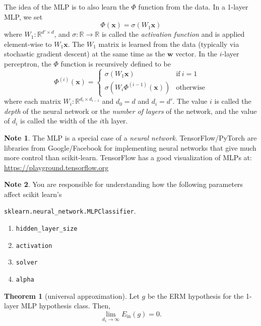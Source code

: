 \documentclass[10pt]{exam}
\theoremstyle{definition}
\newtheorem{note}{Note}
\newtheorem{theorem}{Theorem}
\newcommand{\R}{\mathbb R}
\newcommand{\Ein}{E_{\text{in}}}
\newcommand{\w}{\mathbf w}
\newcommand{\x}{\mathbf x}
\begin{document}
The idea of the MLP is to also learn the $\Phi$ function from the data.
In a 1-layer MLP, we set
\begin{equation}
    \Phi(\x) = \sigma ( W_1 \x)
\end{equation}
where $W_1 : \R^{d'\times d}$,
and $\sigma : \R \to \R$ is called the \emph{activation function} and is applied element-wise to $W_1\x$.
The $W_1$ matrix is learned from the data (typically via stochastic gradient descent) at the same time as the $\w$ vector.
In the $i$-layer perceptron, the $\Phi$ function is recursively defined to be
\begin{equation}
    \Phi^{(i)}(\x) =
    \begin{cases}
        \sigma (W_1 \x) & \text{if}~i = 1 \\
        \sigma (W_i \Phi^{(i-1)}(\x)) & \text{otherwise}
    \end{cases}
\end{equation}
where each matrix $W_i : \R^{d_i \times d_{i-1}}$ and $d_0 = d$ and $d_i = d'$.
The value $i$ is called the \emph{depth} of the neural network or the \emph{number of layers} of the network, and the value of $d_i$ is called the width of the $i$th layer.

\begin{note}
    The MLP is a special case of a \emph{neural network}.
    TensorFlow/PyTorch are libraries from Google/Facebook for implementing neural networks that give much more control than scikit-learn.
%
    TensorFlow has a good visualization of MLPs at:
    \url{https://playground.tensorflow.org}
\end{note}

\begin{note}
    You are responsible for understanding how the following parameters affect scikit learn's

    \noindent
    \lstinline{sklearn.neural_network.MLPClassifier}.
    \begin{enumerate}
        \item \lstinline{hidden_layer_size}
        \item \lstinline{activation}
        \item \lstinline{solver}
        \item \lstinline{alpha}
    \end{enumerate}
\end{note}


\newpage
\begin{theorem}[universal approximation]
    Let $g$ be the ERM hypothesis for the 1-layer MLP hypothesis class.
    Then,
    \begin{equation}
        \lim_{d_1\to\infty} \Ein(g) = 0
        .
    \end{equation}
\end{theorem}
\end{document}
